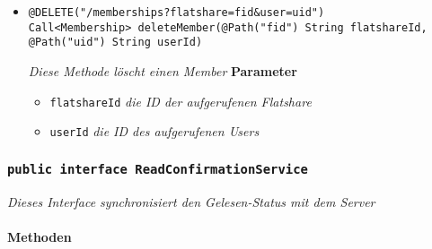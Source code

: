 \begin{itemize}
	      \item\texttt{{@DELETE("/memberships?flatshare={fid}\&user={uid}")\\Call<Membership> deleteMember(@Path("fid") String flatshareId, @Path("uid") String userId)}}

		\textit{Diese Methode löscht einen Member}        	
		\textbf{Parameter} 
			\begin{itemize}
				\item\texttt{flatshareId}
		 		\textit{die ID der aufgerufenen Flatshare}
		 		\item\texttt{userId}
		 		\textit{die ID des aufgerufenen Users}
	 		\end{itemize}		

	 \end{itemize}

	\subsubsection{\texttt{public interface ReadConfirmationService }}
\textit{Dieses Interface synchronisiert den Gelesen-Status mit dem Server}\\
\\
	\textbf{Methoden} 

